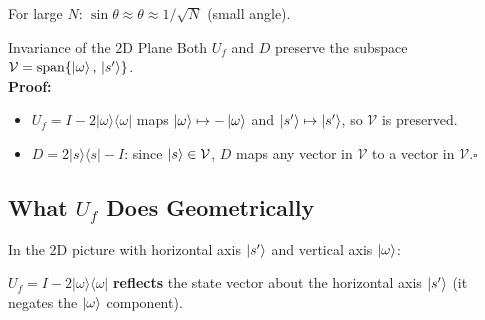 \documentclass[12pt,a4paper]{article}
\newcommand{\proj}[1]{\vert#1\rangle\langle#1\vert}
\begin{document}
For large $N$: $\sin\theta \approx \theta \approx 1/\sqrt{N}$ (small angle).

\begin{thmbox}{Invariance of the 2D Plane}
Both $U_f$ and $D$ preserve the subspace $\mathcal{V} = \mathrm{span}\{\ket{\omega},\,\ket{s'}\}$.\\[4pt]
\textbf{Proof:} 
\begin{itemize}
  \item $U_f = I - 2\proj{\omega}$ maps $\ket{\omega}\mapsto-\ket{\omega}$ and $\ket{s'}\mapsto\ket{s'}$, so $\mathcal{V}$ is preserved.
  \item $D = 2\proj{s}-I$: since $\ket{s}\in\mathcal{V}$, $D$ maps any vector in $\mathcal{V}$ to a vector in $\mathcal{V}$.\quad$\square$
\end{itemize}
\end{thmbox}

\subsection{What $U_f$ Does Geometrically}

In the 2D picture with horizontal axis $\ket{s'}$ and vertical axis $\ket{\omega}$:

$U_f = I - 2\proj{\omega}$ \textbf{reflects} the state vector about the horizontal axis $\ket{s'}$ (it negates the $\ket{\omega}$ component).
\end{document}

